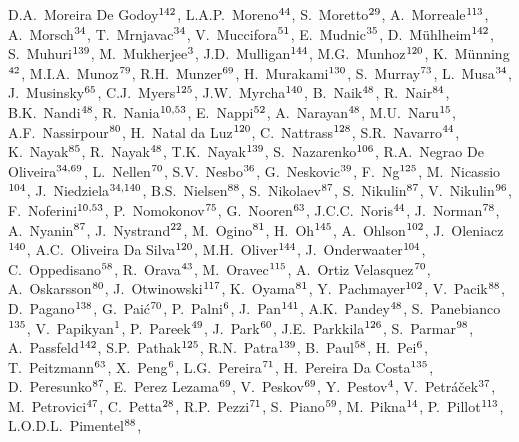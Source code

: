 \begin{flushleft}
D.A.~Moreira De Godoy$^{\rm 142}$, 
L.A.P.~Moreno$^{\rm 44}$, 
S.~Moretto$^{\rm 29}$, 
A.~Morreale$^{\rm 113}$, 
A.~Morsch$^{\rm 34}$, 
T.~Mrnjavac$^{\rm 34}$, 
V.~Muccifora$^{\rm 51}$, 
E.~Mudnic$^{\rm 35}$, 
D.~M{\"u}hlheim$^{\rm 142}$, 
S.~Muhuri$^{\rm 139}$, 
M.~Mukherjee$^{\rm 3}$, 
J.D.~Mulligan$^{\rm 144}$, 
M.G.~Munhoz$^{\rm 120}$, 
K.~M\"{u}nning$^{\rm 42}$, 
M.I.A.~Munoz$^{\rm 79}$, 
R.H.~Munzer$^{\rm 69}$, 
H.~Murakami$^{\rm 130}$, 
S.~Murray$^{\rm 73}$, 
L.~Musa$^{\rm 34}$, 
J.~Musinsky$^{\rm 65}$, 
C.J.~Myers$^{\rm 125}$, 
J.W.~Myrcha$^{\rm 140}$, 
B.~Naik$^{\rm 48}$, 
R.~Nair$^{\rm 84}$, 
B.K.~Nandi$^{\rm 48}$, 
R.~Nania$^{\rm 10,53}$, 
E.~Nappi$^{\rm 52}$, 
A.~Narayan$^{\rm 48}$, 
M.U.~Naru$^{\rm 15}$, 
A.F.~Nassirpour$^{\rm 80}$, 
H.~Natal da Luz$^{\rm 120}$, 
C.~Nattrass$^{\rm 128}$, 
S.R.~Navarro$^{\rm 44}$, 
K.~Nayak$^{\rm 85}$, 
R.~Nayak$^{\rm 48}$, 
T.K.~Nayak$^{\rm 139}$, 
S.~Nazarenko$^{\rm 106}$, 
R.A.~Negrao De Oliveira$^{\rm 34,69}$, 
L.~Nellen$^{\rm 70}$, 
S.V.~Nesbo$^{\rm 36}$, 
G.~Neskovic$^{\rm 39}$, 
F.~Ng$^{\rm 125}$, 
M.~Nicassio$^{\rm 104}$, 
J.~Niedziela$^{\rm 34,140}$, 
B.S.~Nielsen$^{\rm 88}$, 
S.~Nikolaev$^{\rm 87}$, 
S.~Nikulin$^{\rm 87}$, 
V.~Nikulin$^{\rm 96}$, 
F.~Noferini$^{\rm 10,53}$, 
P.~Nomokonov$^{\rm 75}$, 
G.~Nooren$^{\rm 63}$, 
J.C.C.~Noris$^{\rm 44}$, 
J.~Norman$^{\rm 78}$, 
A.~Nyanin$^{\rm 87}$, 
J.~Nystrand$^{\rm 22}$, 
M.~Ogino$^{\rm 81}$, 
H.~Oh$^{\rm 145}$, 
A.~Ohlson$^{\rm 102}$, 
J.~Oleniacz$^{\rm 140}$, 
A.C.~Oliveira Da Silva$^{\rm 120}$, 
M.H.~Oliver$^{\rm 144}$, 
J.~Onderwaater$^{\rm 104}$, 
C.~Oppedisano$^{\rm 58}$, 
R.~Orava$^{\rm 43}$, 
M.~Oravec$^{\rm 115}$, 
A.~Ortiz Velasquez$^{\rm 70}$, 
A.~Oskarsson$^{\rm 80}$, 
J.~Otwinowski$^{\rm 117}$, 
K.~Oyama$^{\rm 81}$, 
Y.~Pachmayer$^{\rm 102}$, 
V.~Pacik$^{\rm 88}$, 
D.~Pagano$^{\rm 138}$, 
G.~Pai\'{c}$^{\rm 70}$, 
P.~Palni$^{\rm 6}$, 
J.~Pan$^{\rm 141}$, 
A.K.~Pandey$^{\rm 48}$, 
S.~Panebianco$^{\rm 135}$, 
V.~Papikyan$^{\rm 1}$, 
P.~Pareek$^{\rm 49}$, 
J.~Park$^{\rm 60}$, 
J.E.~Parkkila$^{\rm 126}$, 
S.~Parmar$^{\rm 98}$, 
A.~Passfeld$^{\rm 142}$, 
S.P.~Pathak$^{\rm 125}$, 
R.N.~Patra$^{\rm 139}$, 
B.~Paul$^{\rm 58}$, 
H.~Pei$^{\rm 6}$, 
T.~Peitzmann$^{\rm 63}$, 
X.~Peng$^{\rm 6}$, 
L.G.~Pereira$^{\rm 71}$, 
H.~Pereira Da Costa$^{\rm 135}$, 
D.~Peresunko$^{\rm 87}$, 
E.~Perez Lezama$^{\rm 69}$, 
V.~Peskov$^{\rm 69}$, 
Y.~Pestov$^{\rm 4}$, 
V.~Petr\'{a}\v{c}ek$^{\rm 37}$, 
M.~Petrovici$^{\rm 47}$, 
C.~Petta$^{\rm 28}$, 
R.P.~Pezzi$^{\rm 71}$, 
S.~Piano$^{\rm 59}$, 
M.~Pikna$^{\rm 14}$, 
P.~Pillot$^{\rm 113}$, 
L.O.D.L.~Pimentel$^{\rm 88}$, 

\end{flushleft}
